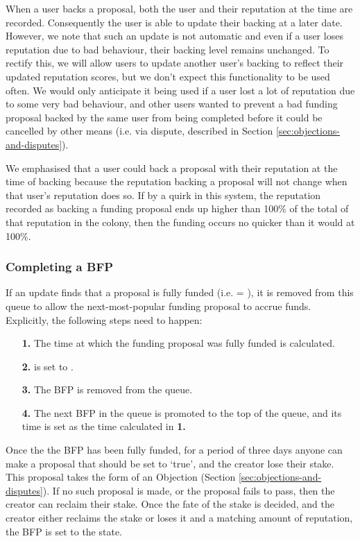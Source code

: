When a user backs a proposal, both the user and their reputation at the time are recorded. Consequently the user is able to update their backing at a later date. However, we note that such an update is not automatic and even if a user loses reputation due to bad behaviour, their backing level remains unchanged. To rectify this, we will allow users to update another user's backing to reflect their updated reputation scores, but we don't expect this functionality to be used often. We would only anticipate it being used if a user lost a lot of reputation due to some very bad behaviour, and other users wanted to prevent a bad funding proposal backed by the same user from being completed before it could be cancelled by other means (i.e. via dispute, described in Section \ref{sec:objections-and-disputes}).

We emphasised that a user could back a proposal with their reputation at the time of backing because the reputation backing a proposal will not change when that user's reputation does so. If by a quirk in this system, the reputation recorded as backing a funding proposal ends up higher than 100\% of the total of that reputation in the colony, then the funding occurs no quicker than it would at 100\%.

\subsubsection*{Completing a BFP}
If an update finds that a proposal is fully funded (i.e.  = ), it is removed from this queue to allow the next-most-popular funding proposal to accrue funds. Explicitly, the following steps need to happen:
\begin{itemize}
 \item[\textbf{1.}] The time at which the funding proposal was fully funded is calculated.%
 \item[\textbf{2.}]  is set to .
 \item[\textbf{3.}] The BFP is removed from the queue.
 \item[\textbf{4.}] The next BFP in the queue is promoted to the top of the queue, and its  time is set as the time calculated in \textbf{1.}
\end{itemize}

Once the the BFP has been fully funded, for a period of three days anyone can make a proposal that  should be set to `true', and the creator lose their stake. This proposal takes the form of an Objection (Section \ref{sec:objections-and-disputes}). If no such proposal is made, or the proposal fails to pass, then the creator can reclaim their stake. Once the fate of the stake is decided, and the creator either reclaims the stake or loses it and a matching amount of reputation, the BFP is set to the  state.


